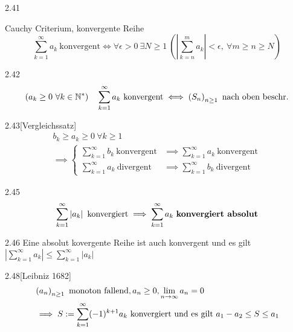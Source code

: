 \begin{satz}{2.41}
    \label{satz:cauchy-criterium-reihe}
    \par Cauchy Criterium, konvergente Reihe
    \[
        \sum_{k=1}^\infty a_k\ \mbox{konvergent}
        \iff
        \forall \epsilon > 0\ \exists N \ge 1\ \left( \left| \sum_{k=n}^m a_k \right| < \epsilon,\ \forall m \ge n \ge N \right)
    \]
\end{satz}

\begin{satz}{2.42}
    \[
        (a_k \ge 0\ \forall k \in \mathbb{N}^*)
        \quad
        \sum_{k=1}^\infty a_k\ \mbox{konvergent}
        \iff
        \left( S_n \right)_{n \ge 1}\ \mbox{nach oben beschr.}
    \]
\end{satz}

\begin{korollar}{2.43}[Vergleichssatz]
    \begin{align*}
        b_k \ge a_k \ge 0\ \forall k \ge 1 \\
        \implies \begin{cases}
            \sum_{k=1}^\infty b_k\ \mbox{konvergent} & \implies \sum_{k=1}^\infty a_k\ \mbox{konvergent} \\
            \sum_{k=1}^\infty a_k\ \mbox{divergent}  & \implies \sum_{k=1}^\infty b_k\ \mbox{divergent}
        \end{cases}
    \end{align*}
\end{korollar}

\begin{definition}{2.45}
    \[ \sum_{k=1}^\infty \left| a_k \right|\ \mbox{konvergiert} \implies  \sum_{k=1}^\infty a_k\ \mbox{\textbf{konvergiert absolut}} \]
\end{definition}

\begin{satz}{2.46}
    Eine absolut kovergente Reihe ist auch konvergent und es gilt $\left| \sum_{k=1}^\infty a_k \right| \le \sum_{k=1}^\infty \left| a_k \right|$
\end{satz}

\begin{satz}{2.48}[Leibniz 1682]
    \begin{align*}
         & \seq{a}\ \mbox{monoton fallend}, a_n \ge 0, \lim_{n \to \infty} a_n = 0                                  \\
         & \implies S := \sum_{k=1}^\infty (-1)^{k+1} a_k \ \mbox{konvergiert und es gilt}\ a_1 - a_2 \le S \le a_1
    \end{align*}
\end{satz}

